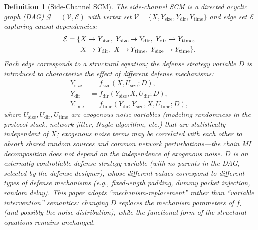 \documentclass[lettersize,journal]{IEEEtran}
\newtheorem{definition}{Definition}
\begin{document}
\begin{definition}[Side-Channel SCM]\label{def:scm}
The side-channel SCM is a directed acyclic graph (DAG)
$\mathcal{G}=(\mathcal{V},\mathcal{E})$ with vertex set
$\mathcal{V}=\{X, Y_{\mathrm{size}}, Y_{\mathrm{dir}}, Y_{\mathrm{time}}\}$
and edge set $\mathcal{E}$ capturing causal dependencies:
\begin{align}\label{eq:scm-edges}
\mathcal{E} = \{&X\to Y_{\mathrm{size}},\; Y_{\mathrm{size}}\to Y_{\mathrm{dir}},\;
Y_{\mathrm{dir}}\to Y_{\mathrm{time}},\notag\\
&X\to Y_{\mathrm{dir}},\;
X \to Y_{\mathrm{time}},\; Y_{\mathrm{size}}\to Y_{\mathrm{time}}\}.
\end{align}
Each edge corresponds to a structural equation; the defense strategy
variable $D$ is introduced to characterize the effect of different defense
mechanisms:
\begin{align}
Y_{\mathrm{size}} &= f_{\mathrm{size}}(X, U_{\mathrm{size}}; D), \label{eq:f-size}\\
Y_{\mathrm{dir}}  &= f_{\mathrm{dir}}(Y_{\mathrm{size}}, X, U_{\mathrm{dir}}; D), \label{eq:f-dir}\\
Y_{\mathrm{time}} &= f_{\mathrm{time}}(Y_{\mathrm{dir}}, Y_{\mathrm{size}}, X, U_{\mathrm{time}}; D), \label{eq:f-time}
\end{align}
where $U_{\mathrm{size}}, U_{\mathrm{dir}}, U_{\mathrm{time}}$ are
exogenous noise variables (modeling randomness in the protocol stack,
network jitter, Nagle algorithm, etc.) that are statistically independent
of $X$; exogenous noise terms may be correlated with each other to absorb
shared random sources and common network perturbations---the chain MI
decomposition does not depend on the independence of exogenous noise.
$D$ is an externally controllable defense strategy variable (with no
parents in the DAG, selected by the defense designer), whose different
values correspond to different types of defense mechanisms (e.g.,
fixed-length padding, dummy packet injection, random delay).
This paper adopts ``mechanism-replacement'' rather than ``variable
intervention'' semantics: changing $D$ replaces the mechanism parameters
of $f_{\cdot}$ (and possibly the noise distribution), while the functional
form of the structural equations remains unchanged.
\end{definition}
\end{document}
